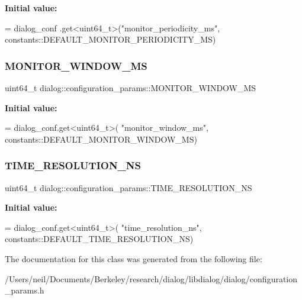{\bfseries Initial value\+:}
\begin{DoxyCode}
= dialog\_conf
    .get<uint64\_t>(\textcolor{stringliteral}{"monitor\_periodicity\_ms"},
                   constants::DEFAULT\_MONITOR\_PERIODICITY\_MS)
\end{DoxyCode}
\mbox{\label{classdialog_1_1configuration__params_a2ce4e104d048a223e2cf076e47fb156b}} 
\subsubsection{\texorpdfstring{M\+O\+N\+I\+T\+O\+R\+\_\+\+W\+I\+N\+D\+O\+W\+\_\+\+MS}{MONITOR\_WINDOW\_MS}}
{\footnotesize\ttfamily uint64\+\_\+t dialog\+::configuration\+\_\+params\+::\+M\+O\+N\+I\+T\+O\+R\+\_\+\+W\+I\+N\+D\+O\+W\+\_\+\+MS\hspace{0.3cm}{\ttfamily [static]}}

{\bfseries Initial value\+:}
\begin{DoxyCode}
= dialog\_conf.get<uint64\_t>(
    \textcolor{stringliteral}{"monitor\_window\_ms"}, constants::DEFAULT\_MONITOR\_WINDOW\_MS)
\end{DoxyCode}
\mbox{\label{classdialog_1_1configuration__params_aa78f1536592cb4f05573a29ec231cc50}} 
\subsubsection{\texorpdfstring{T\+I\+M\+E\+\_\+\+R\+E\+S\+O\+L\+U\+T\+I\+O\+N\+\_\+\+NS}{TIME\_RESOLUTION\_NS}}
{\footnotesize\ttfamily uint64\+\_\+t dialog\+::configuration\+\_\+params\+::\+T\+I\+M\+E\+\_\+\+R\+E\+S\+O\+L\+U\+T\+I\+O\+N\+\_\+\+NS\hspace{0.3cm}{\ttfamily [static]}}

{\bfseries Initial value\+:}
\begin{DoxyCode}
= dialog\_conf.get<uint64\_t>(
    \textcolor{stringliteral}{"time\_resolution\_ns"}, constants::DEFAULT\_TIME\_RESOLUTION\_NS)
\end{DoxyCode}


The documentation for this class was generated from the following file\+:\begin{DoxyCompactItemize}
\item 
/\+Users/neil/\+Documents/\+Berkeley/research/dialog/libdialog/dialog/configuration\+\_\+params.\+h\end{DoxyCompactItemize}
